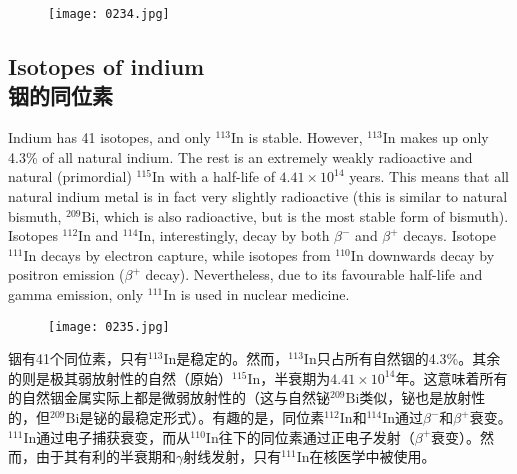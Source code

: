 \documentclass[dvipsnames, svgnames,a4paper,11pt]{article}
\begin{document}
\begin{figure}[h]
	\centering
    \texttt{[image: 0234.jpg]}  
     \label{fig311}
\end{figure}

\subsection{Isotopes of indium\\ 铟的同位素}  
Indium has 41 isotopes, and only \(\mathrm{^{113}In}\) is stable. However, \(\mathrm{^{113}In}\) makes up only 4.3\% of all natural indium. The rest is an extremely weakly radioactive and natural (primordial) \(\mathrm{^{115}In}\) with a half-life of \(4.41 \times 10^{14}\) years. This means that all natural indium metal is in fact very slightly radioactive (this is similar to natural bismuth, \(\mathrm{^{209}Bi}\), which is also radioactive, but is the most stable form of bismuth). Isotopes \(\mathrm{^{112}In}\) and \(\mathrm{^{114}In}\), interestingly, decay by both \(\beta^-\) and \(\beta^+\) decays. Isotope \(\mathrm{^{111}In}\) decays by electron capture, while isotopes from \(\mathrm{^{110}In}\) downwards decay by positron emission (\(\beta^+\) decay). Nevertheless, due to its favourable half-life and gamma emission, only \(\mathrm{^{111}In}\) is used in nuclear medicine.


\begin{figure}[h]
	\centering
    \texttt{[image: 0235.jpg]}  
     \label{fig312}
\end{figure}

铟有41个同位素，只有\(\mathrm{^{113}In}\)是稳定的。然而，\(\mathrm{^{113}In}\)只占所有自然铟的4.3\%。其余的则是极其弱放射性的自然（原始）\(\mathrm{^{115}In}\)，半衰期为\(4.41 \times 10^{14}\)年。这意味着所有的自然铟金属实际上都是微弱放射性的（这与自然铋\(\mathrm{^{209}Bi}\)类似，铋也是放射性的，但\(\mathrm{^{209}Bi}\)是铋的最稳定形式）。有趣的是，同位素\(\mathrm{^{112}In}\)和\(\mathrm{^{114}In}\)通过\(\beta^-\)和\(\beta^+\)衰变。 \(\mathrm{^{111}In}\)通过电子捕获衰变，而从\(\mathrm{^{110}In}\)往下的同位素通过正电子发射（\(\beta^+\)衰变）。然而，由于其有利的半衰期和$\gamma$射线发射，只有\(\mathrm{^{111}In}\)在核医学中被使用。
\end{document}
